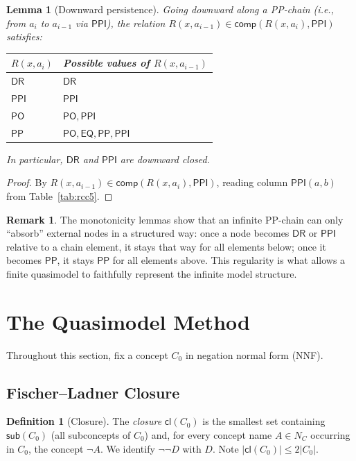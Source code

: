 \documentclass[a4paper,11pt]{article}
\newtheorem{lemma}[theorem]{Lemma}
\theoremstyle{definition}
\newtheorem{definition}[theorem]{Definition}
\newtheorem{remark}[theorem]{Remark}
\newcommand{\NC}{\ensuremath{N_C}}
\newcommand{\DR}{\ensuremath{\mathsf{DR}}}
\newcommand{\PO}{\ensuremath{\mathsf{PO}}}
\newcommand{\EQ}{\ensuremath{\mathsf{EQ}}}
\newcommand{\PP}{\ensuremath{\mathsf{PP}}}
\newcommand{\PPI}{\ensuremath{\mathsf{PPI}}}
\newcommand{\comp}{\ensuremath{\mathsf{comp}}}
\newcommand{\cl}{\ensuremath{\mathsf{cl}}}
\newcommand{\sub}{\ensuremath{\mathsf{sub}}}
\begin{document}
\begin{lemma}[Downward persistence]
\label{lem:downward}
Going \emph{downward} along a PP-chain \textup{(}i.e., from $a_{i}$
to $a_{i-1}$ via $\PPI$\textup{)}, the relation $R(x, a_{i-1}) \in
\comp(R(x, a_i), \PPI)$ satisfies:
\begin{center}
\renewcommand{\arraystretch}{1.1}
\begin{tabular}{ll}
\toprule
$R(x, a_i)$ & Possible values of $R(x, a_{i-1})$ \\
\midrule
$\DR$  & $\DR$ \\
$\PPI$ & $\PPI$ \\
$\PO$  & $\PO, \PPI$ \\
$\PP$  & $\PO, \EQ, \PP, \PPI$ \\
\bottomrule
\end{tabular}
\end{center}
In particular, $\DR$ and $\PPI$ are downward closed.
\end{lemma}

\begin{proof}
By $R(x, a_{i-1}) \in \comp(R(x, a_i), \PPI)$, reading column
$\PPI(a,b)$ from Table~\ref{tab:rcc5}.
\end{proof}

\begin{remark}
The monotonicity lemmas show that an infinite PP-chain can only
``absorb'' external nodes in a structured way: once a node becomes
$\DR$ or $\PPI$ relative to a chain element, it stays that way for all
elements below; once it becomes $\PP$, it stays $\PP$ for all elements
above.  This regularity is what allows a finite quasimodel to
faithfully represent the infinite model structure.
\end{remark}

\section{The Quasimodel Method}
\label{sec:quasimodel}

Throughout this section, fix a concept $C_0$ in negation normal form
(NNF).

\subsection{Fischer--Ladner Closure}

\begin{definition}[Closure]
\label{def:closure}
The \emph{closure} $\cl(C_0)$ is the smallest set containing
$\sub(C_0)$ (all subconcepts of $C_0$) and, for every concept name
$A \in \NC$ occurring in $C_0$, the concept $\neg A$.  We identify
$\neg\neg D$ with $D$.  Note $|\cl(C_0)| \leq 2|C_0|$.
\end{definition}
\end{document}
